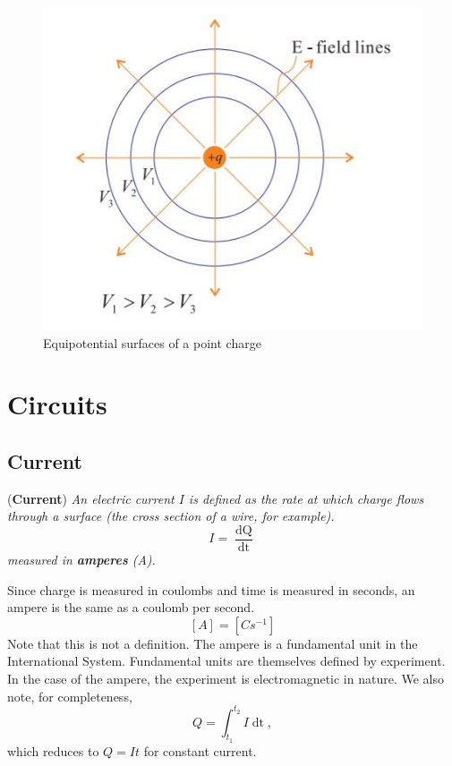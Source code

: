 \begin{figure}[h!]
    \centering
    \includegraphics{notes/images/Equipotential.JPG}
    \caption{Equipotential surfaces of a point charge}
    \label{fig:equipotential}
\end{figure}
\FloatBarrier


\section{Circuits}

\subsection{Current}

\begin{definition}{(\textbf{Current})}
\label{def:current}
\textit{An electric current $I$ is defined as the rate at which charge flows through a surface (the cross section of a wire, for example).} 
\begin{equation}
    I = \frac{\mathop{\mathrm{d}Q}}{\mathop{\mathrm{d}t}}
\end{equation}
\textit{measured in \textbf{amperes} (A).}
\end{definition}

Since charge is measured in coulombs and time is measured in seconds, an ampere is the same as a coulomb per second.
\begin{equation*}
    \left[A\right] = \left[Cs^{-1}\right]
\end{equation*}
Note that this is not a definition. The ampere is a fundamental unit in the International System. Fundamental units are themselves defined by experiment. In the case of the ampere, the experiment is electromagnetic in nature. We also note, for completeness, 
\begin{equation}
    Q = \int_{t_1}^{t_2} I \mathop{\mathrm{d}t},
\end{equation}
which reduces to $Q = It$ for constant current.


